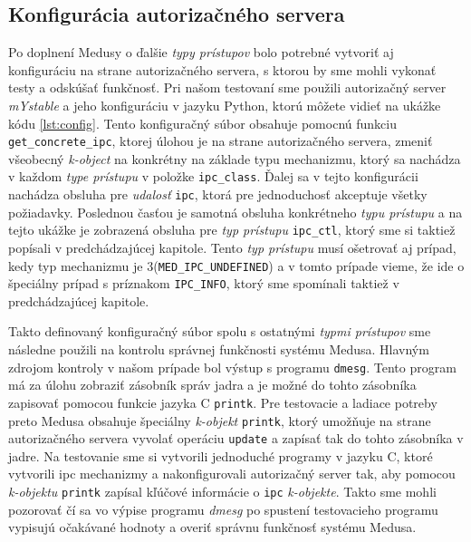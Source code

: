 \subsection{Konfigurácia autorizačného servera}
Po doplnení Medusy o ďalšie \textit{typy prístupov} bolo potrebné vytvoriť aj konfiguráciu na strane autorizačného servera, s ktorou by sme mohli vykonať testy a odskúšať funkčnosť. Pri našom testovaní sme použili autorizačný server \textit{mYstable} a jeho konfiguráciu v jazyku Python, ktorú môžete vidieť na ukážke kódu \ref{lst:config}. Tento konfiguračný súbor obsahuje pomocnú funkciu \texttt{get\_concrete\_ipc}, ktorej úlohou je na strane autorizačného servera, zmeniť všeobecný \textit{k-object} na konkrétny na základe typu mechanizmu, ktorý sa nachádza v každom \textit{type prístupu} v položke \texttt{ipc\_class}. Ďalej sa v tejto konfigurácii nachádza obsluha pre \textit{udalosť} \texttt{ipc}, ktorá pre jednoduchosť akceptuje všetky požiadavky. Poslednou časťou je samotná obsluha konkrétneho \textit{typu prístupu} a na tejto ukážke je zobrazená obsluha pre \textit{typ prístupu} \texttt{ipc\_ctl}, ktorý sme si taktiež popísali v predchádzajúcej kapitole. Tento \textit{typ prístupu} musí ošetrovať aj prípad, kedy typ mechanizmu je 3(\texttt{MED\_IPC\_UNDEFINED}) a v tomto prípade vieme, že ide o špeciálny prípad s príznakom \texttt{IPC\_INFO}, ktorý sme spomínali taktiež v predchádzajúcej kapitole. 

Takto definovaný konfiguračný súbor spolu s ostatnými \textit{typmi prístupov} sme následne použili na kontrolu správnej funkčnosti systému Medusa. Hlavným zdrojom kontroly v našom prípade bol výstup s programu \texttt{dmesg}. Tento program má za úlohu zobraziť zásobník správ jadra a je možné do tohto zásobníka zapisovať pomocou funkcie jazyka C \texttt{printk}. Pre testovacie a ladiace potreby preto Medusa obsahuje špeciálny \textit{k-objekt} \texttt{printk}, ktorý umožňuje na strane autorizačného servera vyvolať operáciu \texttt{update} a zapísať tak do tohto zásobníka v jadre. Na testovanie sme si vytvorili jednoduché programy v jazyku C, ktoré vytvorili \acrshort{ipc} mechanizmy a nakonfigurovali autorizačný server tak, aby pomocou \textit{k-objektu} \texttt{printk} zapísal kľúčové informácie o \texttt{ipc} \textit{k-objekte}. Takto sme mohli pozorovať čí sa vo výpise programu \textit{dmesg} po spustení testovacieho programu vypisujú očakávané hodnoty a overiť správnu funkčnosť systému Medusa.
